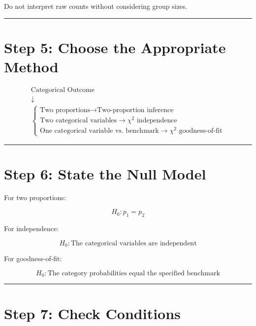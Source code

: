 \documentclass[
  letterpaper,
  DIV=11,
  numbers=noendperiod]{scrreprt}
\begin{document}
Do not interpret raw counts without considering group sizes.

\begin{center}\rule{0.5\linewidth}{0.5pt}\end{center}

\section{Step 5: Choose the Appropriate
Method}\label{step-5-choose-the-appropriate-method}

\[
\begin{array}{c}
\text{Categorical Outcome}\\
\downarrow\\
\begin{cases}
\text{Two proportions}
\rightarrow
\text{Two-proportion inference}\\[6pt]
\text{Two categorical variables}
\rightarrow
\chi^2\text{ independence}\\[6pt]
\text{One categorical variable vs. benchmark}
\rightarrow
\chi^2\text{ goodness-of-fit}
\end{cases}
\end{array}
\]

\begin{center}\rule{0.5\linewidth}{0.5pt}\end{center}

\section{Step 6: State the Null
Model}\label{step-6-state-the-null-model}

For two proportions:

\[
H_0:p_1=p_2
\]

For independence:

\[
H_0:
\text{The categorical variables are independent}
\]

For goodness-of-fit:

\[
H_0:
\text{The category probabilities equal the specified benchmark}
\]

\begin{center}\rule{0.5\linewidth}{0.5pt}\end{center}

\section{Step 7: Check Conditions}\label{step-7-check-conditions-1}
\end{document}
